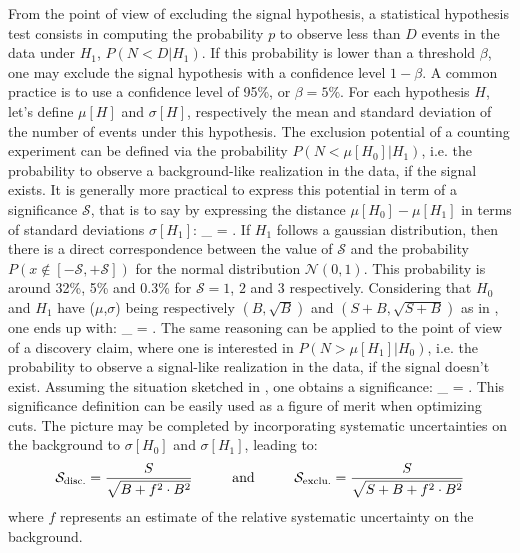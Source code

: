     From the point of view of excluding the signal hypothesis, a statistical
    hypothesis test consists in computing the probability $p$ to observe less
    than $D$ events in the data under $H_1$, $P(N < D|H_1)$. If this probability
    is lower than a threshold $\beta$, one may exclude the signal hypothesis
    with a confidence level $1-\beta$. A common practice is to use a confidence
    level of 95\%, or $\beta = 5\%$. For each hypothesis $H$, let's define
    $\mu[H]$ and $\sigma[H]$, respectively the mean and standard deviation of
    the number of events under this hypothesis.  The exclusion potential of a
    counting experiment can be defined via the probability $P(N <
    \mu[H_0]|H_1)$, i.e. the probability to observe a background-like
    realization in the data, if the signal exists. It is generally more
    practical to express this potential in term of a significance $\mathcal{S}$,
    that is to say by expressing the distance $\mu[H_0] - \mu[H_1]$ in terms of
    standard deviations $\sigma[H_1]$:
    {
        _ = \frac{\mu[H_0] - \mu[H_1]}{\sigma[H_1]}.
    }
    If $H_1$ follows a gaussian distribution, then there is a direct
    correspondence between the value of $\mathcal{S}$ and the probability $P(x
    \notin [-\mathcal{S},+\mathcal{S}])$ for the normal distribution
    $\mathcal{N}(0,1)$. This probability is around 32\%, 5\% and 0.3\% for
    $\mathcal{S} = 1$, $2$ and $3$ respectively.  Considering that $H_0$ and
    $H_1$ have ($\mu$,$\sigma$) being respectively $(B,\sqrt{B})$ and
    $(S+B,\sqrt{S+B})$ as in , one ends up with:
    {
        _ = .
    }
    The same reasoning can be applied to the point of view of a discovery claim,
    where one is interested in $P(N > \mu[H_1]|H_0)$, i.e. the probability to
    observe a signal-like realization in the data, if the signal doesn't exist.
    Assuming the situation sketched in , one obtains
    a significance:
    {
        _ = .
    }
    This significance definition can be easily used as a figure of merit when
    optimizing cuts. The picture may be completed by incorporating systematic
    uncertainties on the background to $\sigma[H_0]$ and $\sigma[H_1]$, leading
    to:
    \begin{equation}
       \mathcal{S}_\text{disc.} = \frac{S}{\sqrt{B+f^2 \cdot B^2}}
       \hspace*{1cm}
       \text{and}
       \hspace*{1cm}
       \mathcal{S}_\text{exclu.} = \frac{S}{\sqrt{S+B+f^2 \cdot B^2}}
       \label{FoM}
   \end{equation}
    where $f$ represents an estimate of the relative systematic uncertainty on
    the background.

